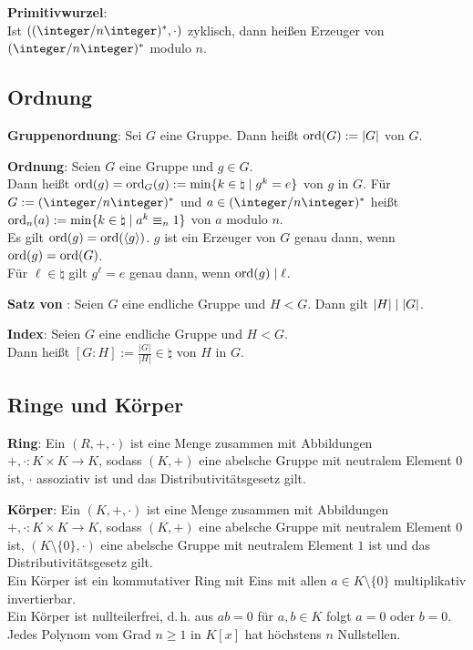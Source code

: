 \textbf{Primitivwurzel}:\\
Ist $((\ZnZ)^\ast, \cdot)$ zyklisch, dann heißen Erzeuger von $(\ZnZ)^\ast$
 modulo $n$.

\pagebreak

\subsection{%
    Ordnung%
}

\textbf{Gruppenordnung}:
Sei $G$ eine Gruppe.
Dann heißt $\operatorname{ord}(G) := |G|$  von $G$.

\textbf{Ordnung}:
Seien $G$ eine Gruppe und $g \in G$.\\
Dann heißt $\operatorname{ord}(g) = \operatorname{ord}_G(g) := \min\{k \in \natural \;|\; g^k = e\}$
 von $g$ in $G$.
Für $G := (\integer/n\integer)^\ast$ und $a \in (\integer/n\integer)^\ast$
heißt $\operatorname{ord}_n(a) := \min\{k \in \natural \;|\; a^k \equiv_n 1\}$
 von $a$ modulo $n$.\\
Es gilt $\operatorname{ord}(g) = \operatorname{ord}(\langle g\rangle)$.
$g$ ist ein Erzeuger von $G$ genau dann, wenn $\operatorname{ord}(g) = \operatorname{ord}(G)$.\\
Für $\ell \in \natural$ gilt $g^\ell = e$ genau dann, wenn $\operatorname{ord}(g) \mid \ell$.

\textbf{Satz von }:
Seien $G$ eine endliche Gruppe und $H < G$.
Dann gilt $|H| \mid |G|$.

\textbf{Index}:
Seien $G$ eine endliche Gruppe und $H < G$.\\
Dann heißt $[G : H] := \frac{|G|}{|H|} \in \natural$  von $H$ in $G$.

\subsection{%
    Ringe und Körper%
}

\textbf{Ring}:
Ein  $(R, +, \cdot)$ ist eine Menge zusammen mit Abbildungen
$+, \cdot\colon K \times K \rightarrow K$,
sodass $(K, +)$ eine abelsche Gruppe mit neutralem Element $0$ ist,
$\cdot$ assoziativ ist und
das Distributivitätsgesetz gilt.

\textbf{Körper}:
Ein  $(K, +, \cdot)$ ist eine Menge zusammen mit Abbildungen
$+, \cdot\colon K \times K \rightarrow K$,
sodass $(K, +)$ eine abelsche Gruppe mit neutralem Element $0$ ist,
$(K \setminus \{0\}, \cdot)$ eine abelsche Gruppe mit neutralem Element $1$ ist und
das Distributivitätsgesetz gilt.\\
Ein Körper ist ein kommutativer Ring mit Eins mit allen $a \in K \setminus \{0\}$
multiplikativ invertierbar.\\
Ein Körper ist nullteilerfrei, d.\,h. aus $ab = 0$ für $a, b \in K$ folgt
$a = 0$ oder $b = 0$.\\
Jedes Polynom vom Grad $n \ge 1$ in $K[x]$ hat höchstens $n$ Nullstellen.

